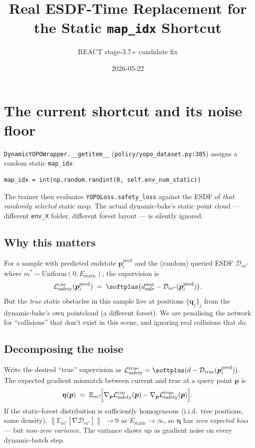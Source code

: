 \documentclass[11pt]{article}
\title{Real ESDF-Time Replacement for the Static \texttt{map\_idx} Shortcut}
\author{REACT stage-3.7+ candidate fix}
\date{2026-05-22}
\newcommand{\Norm}[1]{\left\lVert #1 \right\rVert}
\newcommand{\esdf}{\mathcal{D}}
\begin{document}
\maketitle

\section{The current shortcut and its noise floor}

\texttt{DynamicYOPOWrapper.\_\_getitem\_\_} (\texttt{policy/yopo\_dataset.py:385})
assigns a random static \texttt{map\_idx}:
\begin{verbatim}
map_idx = int(np.random.randint(0, self.env_num_static))
\end{verbatim}

The trainer then evaluates \texttt{YOPOLoss.safety\_loss} against the ESDF of
\emph{that randomly selected} static map. The actual dynamic-bake's static
point cloud --- different \texttt{env\_X} folder, different forest layout ---
is silently ignored.

\subsection{Why this matters}

For a sample with predicted endstate $\bm{p}_i^{\text{pred}}$ and the (random)
queried ESDF $\esdf_{m^*}$ where $m^* \sim \mathrm{Uniform}(0, E_{\text{static}})$,
the supervision is
\begin{equation}\label{eq:safety-current}
\mathcal{L}_{\text{safety}}^{\text{cur}}(\bm{p}_i^{\text{pred}})
\;=\;
\softplus\bigl(d_{\text{safe}}^{\text{stat}} - \esdf_{m^*}(\bm{p}_i^{\text{pred}})\bigr).
\end{equation}
But the \emph{true} static obstacles in this sample live at positions
$\{\bm{q}_j\}_{j}$ from the dynamic-bake's own pointcloud (a different forest).
We are penalising the network for ``collisions'' that don't exist in this
scene, and ignoring real collisions that do.

\subsection{Decomposing the noise}

Write the desired ``true'' supervision as
$\mathcal{L}_{\text{safety}}^{\text{true}} = \softplus(d - \esdf_{\text{true}}(\bm{p}_i^{\text{pred}}))$.
The expected gradient mismatch between current and true at a query point $\bm{p}$ is
\begin{equation}\label{eq:mismatch}
\bm{\eta}(\bm{p})
\;=\;
\mathbb{E}_{m^*}\!\Bigl[
   \nabla_{\bm{p}} \mathcal{L}_{\text{safety}}^{\text{cur}}(\bm{p}) -
   \nabla_{\bm{p}} \mathcal{L}_{\text{safety}}^{\text{true}}(\bm{p})
\Bigr].
\end{equation}
If the static-forest distribution is sufficiently homogeneous (i.i.d.\ tree
positions, same density), $\Norm{\mathbb{E}_{m^*}[\nabla \esdf_{m^*}]}$
$\to 0$ as $E_{\text{static}} \to \infty$, so $\bm{\eta}$ has \emph{zero
expected bias} --- but \emph{non-zero variance}. The variance shows up as
gradient noise on every dynamic-batch step.
\end{document}
